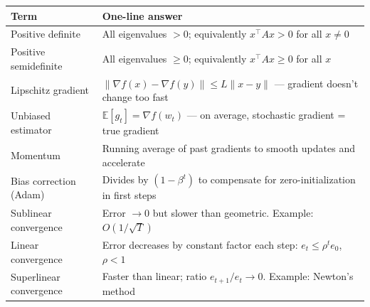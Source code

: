 \documentclass[10pt,a4paper]{article}
\begin{document}
\begin{center}
\renewcommand{\arraystretch}{1.3}
\begin{tabular}{@{}l p{10.5cm}@{}}
\toprule
\textbf{Term} & \textbf{One-line answer} \\
\midrule
Positive definite & All eigenvalues $> 0$; equivalently $x^\top A x > 0$ for all $x \neq 0$ \\
Positive semidefinite & All eigenvalues $\geq 0$; equivalently $x^\top A x \geq 0$ for all $x$ \\
Lipschitz gradient & $\|\nabla f(x) - \nabla f(y)\| \leq L\|x-y\|$ --- gradient doesn't change too fast \\
Unbiased estimator & $\mathbb{E}[g_t] = \nabla f(w_t)$ --- on average, stochastic gradient = true gradient \\
Momentum & Running average of past gradients to smooth updates and accelerate \\
Bias correction (Adam) & Divides by $(1 - \beta^t)$ to compensate for zero-initialization in first steps \\
Sublinear convergence & Error $\to 0$ but slower than geometric. Example: $O(1/\sqrt{T})$ \\
Linear convergence & Error decreases by constant factor each step: $e_t \leq \rho^t e_0$, $\rho < 1$ \\
Superlinear convergence & Faster than linear; ratio $e_{t+1}/e_t \to 0$. Example: Newton's method \\
\bottomrule
\end{tabular}
\end{center}
\end{document}
